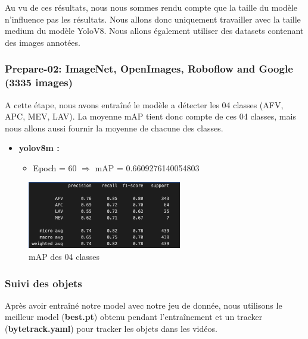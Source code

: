 Au vu de ces résultats, nous nous sommes rendu compte que la taille du modèle n'influence pas les résultats. Nous allons donc uniquement travailler avec la taille medium du modèle YoloV8.
Nous allons également utiliser des datasets contenant des images annotées.


\subsubsection*{Prepare-02: ImageNet, OpenImages, Roboflow and Google  (3335 images)}

A cette étape, nous avons entraîné le modèle a détecter les 04 classes (AFV, APC, MEV, LAV).
La moyenne mAP tient donc compte de ces 04 classes, mais nous allons aussi fournir la moyenne de chacune des classes.

\begin{itemize}
	\item \textbf{yolov8m :}
	      \begin{itemize}
		      \item Epoch = 60 $\Rightarrow$ mAP = 0.6609276140054803
	      \end{itemize}
\end{itemize}

\begin{figure}[h]
	\center
	\includegraphics[width=0.6\textwidth]{./images/map-train.png}
	\caption[mAP des 04 classes]{mAP des 04 classes}\label{fig:fiftyone-dataset}
\end{figure}



\subsubsection{Suivi des objets}

Après avoir entraîné notre model avec notre jeu de donnée, nous utilisons le meilleur model (\textbf{best.pt}) obtenu pendant l'entraînement et un tracker (\textbf{bytetrack.yaml}) pour tracker les objets dans les vidéos.


